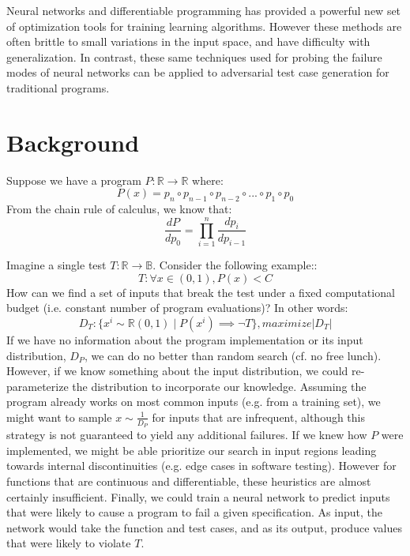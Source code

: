 \documentclass[12pt,initial,twoside,maitrise]{dms}
\numberwithin{equation}{section}
\numberwithin{table}{chapter}
\numberwithin{figure}{chapter}
\begin{document}
Neural networks and differentiable programming has provided a powerful new set of optimization tools for training learning algorithms. However these methods are often brittle to small variations in the input space, and have difficulty with generalization. In contrast, these same techniques used for probing the failure modes of neural networks can be applied to adversarial test case generation for traditional programs.

\section{Background}

Suppose we have a program $P: \mathbb{R}\rightarrow\mathbb{R}$ where:
%
\begin{equation}
    P(x)=p_n \circ p_{n-1} \circ p_{n-2} \circ ... \circ p_1 \circ p_0
\end{equation}
%
From the chain rule of calculus, we know that:
%
\begin{equation}
    \frac{dP}{dp_0} = {\displaystyle \prod_{i=1}^{n} \frac{dp_{i}}{dp_{i-1}}}
\end{equation}

%
%
Imagine a single test $T: \mathbb{R} \rightarrow \mathbb{B}$. Consider the following example::
%
\begin{equation}
    T: \forall x \in (0, 1), P(x) < C
\end{equation}
%
How can we find a set of inputs that break the test under a fixed computational budget (i.e. constant number of program evaluations)? In other words:
%
\begin{equation}
    D_T: \{ x^i \sim \mathbb{R}(0, 1) \mid P(x^i) \implies \neg T \}, maximize |D_T|
\end{equation}
%
If we have no information about the program implementation or its input distribution, $D_P$, we can do no better than random search (cf. no free lunch). However, if we know something about the input distribution, we could re-parameterize the distribution to incorporate our knowledge. Assuming the program already works on most common inputs (e.g. from a training set), we might want to sample $x \sim \frac{1}{D_P}$ for inputs that are infrequent, although this strategy is not guaranteed to yield any additional failures. If we knew how $P$ were implemented, we might be able prioritize our search in input regions leading towards internal discontinuities (e.g. edge cases in software testing). However for functions that are continuous and differentiable, these heuristics are almost certainly insufficient. Finally, we could train a neural network to predict inputs that were likely to cause a program to fail a given specification. As input, the network would take the function and test cases, and as its output, produce values that were likely to violate $T$.
\end{document}
